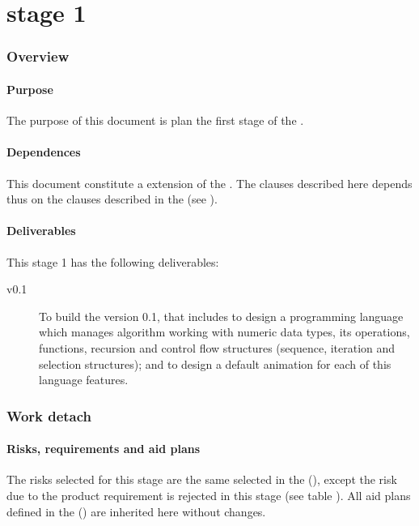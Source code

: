 \documentclass[twocolumn, 9pt]{extarticle}
\begin{document}
\part[\favpl st. 1]{\favpl \\ stage 1}
\label{part:st1-plan}

\section{Overview}

\subsection{Purpose}
The purpose of this document is plan the first stage of the
\favp.

\subsection{Dependences}
This document constitute a extension of the \favpl. The clauses
described here depends thus on the clauses described in the \favpl
(see ).

\subsection{Deliverables}
This stage 1 has the following deliverables:

\begin{description}
\item[\fav v0.1] To build the \fav version 0.1, that includes to design a
  \fav programming language which manages algorithm working with
  numeric data types, its operations, functions, recursion and
  control flow structures (sequence, iteration and selection
  structures); and to design a default animation for each of this
  language features.
\end{description}

\section{Work detach}
\subsection{Risks, requirements and aid plans}
\label{ssec:r-r-aid-plans}
The risks selected for this stage are the same selected in the \favpl
(), except the risk  due to the
product requirement  is rejected in this stage (see
table ). All aid plans defined in the \favpl
() are inherited here without changes.
\end{document}
